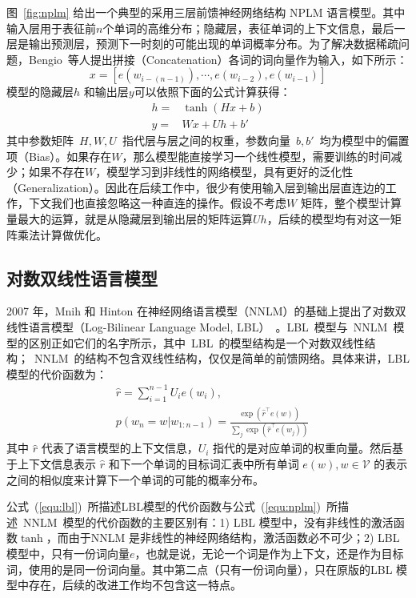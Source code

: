图~\ref{fig:nplm} 给出一个典型的采用三层前馈神经网络结构 NPLM 语言模型。其中输入层用于表征前$n$个单词的高维分布；隐藏层，表征单词的上下文信息，最后一层是输出预测层，预测下一时刻的可能出现的单词概率分布。为了解决数据稀疏问题，Bengio~等人提出拼接（Concatenation）各词的词向量作为输入，如下所示：
\begin{equation}\label{equ:we}
  x = [e(w_{i-(n-1)}), \cdots , e(w_{i-2}), e{(w_{i-1})}]
\end{equation}
模型的隐藏层$h$ 和输出层$y$可以依照下面的公式计算获得：
\begin{equation}\label{equ:nplm}
\begin{split}
h =& \tanh(Hx+b) \\
y =&Wx + Uh +b'
\end{split}
\end{equation}
其中参数矩阵~$H,W,U$~指代层与层之间的权重，参数向量~$b,b'$~均为模型中的偏置项（Bias）。如果存在$W$，那么模型能直接学习一个线性模型，需要训练的时间减少；如果不存在$W$，模型学习到非线性的网络模型，具有更好的泛化性（Generalization）。因此在后续工作中，很少有使用输入层到输出层直连边的工作，下文我们也直接忽略这一种直连的操作。假设不考虑$W$ 矩阵，整个模型计算量最大的运算，就是从隐藏层到输出层的矩阵运算$Uh$，后续的模型均有对这一矩阵乘法计算做优化。

\subsection{对数双线性语言模型}
2007 年，Mnih 和 Hinton 在神经网络语言模型（NNLM）的基础上提出了对数双线性语言模型（Log-Bilinear Language Model, LBL）~。LBL~模型与~NNLM~模型的区别正如它们的名字所示，其中~LBL~的模型结构是一个对数双线性结构；~NNLM~的结构不包含双线性结构，仅仅是简单的前馈网络。具体来讲，LBL 模型的代价函数为：
\begin{equation}
\label{equ:lbl}
\begin{split}
   &\hat r=\sum_{i=1}^{n-1}{U_i e({w_i})}, \\
   &p(w_n=w|w_{1:n-1})=\frac{\exp(\hat r^\top e(w))}{\sum_j{\exp(\hat r^\top e(w_j))}}
\end{split}
\end{equation}
其中 $\hat r$ 代表了语言模型的上下文信息，$U_i$ 指代的是对应单词的权重向量。然后基于上下文信息表示 $\hat r$ 和下一个单词的目标词汇表中所有单词 $e(w),w\in \mathcal{V}$ 的表示之间的相似度来计算下一个单词的可能的概率分布。

公式~(\ref{equ:lbl})~所描述LBL模型的代价函数与公式~(\ref{equ:nplm})~所描述~NNLM~模型的代价函数的主要区别有：1) LBL 模型中，没有非线性的激活函数$\tanh$，而由于NNLM 是非线性的神经网络结构，激活函数必不可少；2) LBL 模型中，只有一份词向量$e$，也就是说，无论一个词是作为上下文，还是作为目标词，使用的是同一份词向量。其中第二点（只有一份词向量），只在原版的LBL 模型中存在，后续的改进工作均不包含这一特点。

